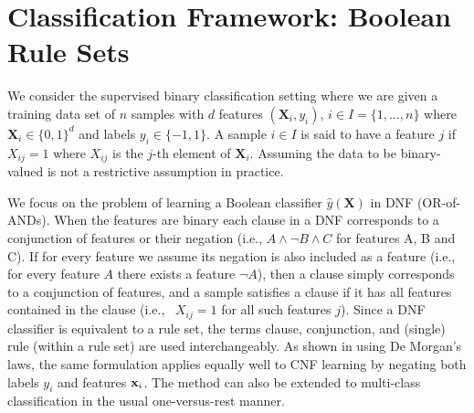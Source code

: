 \documentclass[twoside,11pt]{article}
\begin{document}
\section{Classification Framework: Boolean Rule Sets}\label{sec:class}
We consider the supervised binary classification setting where we are given a training data set of $n$ samples  with $d$ features $(\textbf{X}_i, y_i)$, $i \in I = \{1,\dots,n\}$ where $\textbf{X}_i \in \{0,1\}^d$ and labels $y_i \in \{-1, 1\}$. A sample $i \in I$ is said to have a feature $j$ if $X_{ij} = 1$ where $X_{ij}$ is the $j$-th element of $\textbf{X}_i$. Assuming the data to be binary-valued is not a restrictive assumption in practice.  

We focus on the problem of learning a Boolean classifier $\hat{y}(\textbf{X})$ in DNF (OR-of-ANDs). When the features are binary each clause in a DNF corresponds to a conjunction of features or their negation (i.e., $A \land \neg B \land C$ for features A, B and C). If for every feature we assume its negation is also included as a feature (i.e., for every feature $A$ there exists a feature $\neg A$), then a clause simply corresponds to a conjunction of features, and a sample satisfies a clause if it has all features contained in the clause (i.e., ~$X_{ij} = 1$ for all such features $j$). Since a DNF classifier is equivalent to a rule set, the terms clause, conjunction, and (single) rule (within a rule set) are used interchangeably. As shown in \citep{su2016} using De Morgan's laws, the same formulation applies equally well to CNF learning by negating both labels $y_i$ and features $\mathbf{x}_i$.  The method can also be extended to multi-class classification in the usual one-versus-rest manner.

\end{document}
